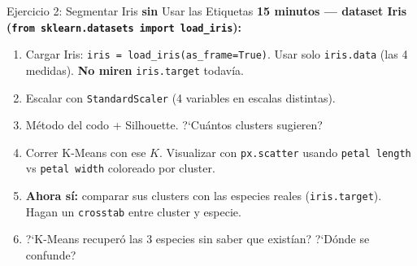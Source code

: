 \documentclass[aspectratio=169, 11pt]{beamer}
\begin{document}
\begin{frame}[shrink=5]{Ejercicio 2: Segmentar Iris \textbf{sin} Usar las Etiquetas}
  \vspace{-4pt}
  {\footnotesize\color{arcaDark}\bfseries
    \faClock\hspace{4pt} 15 minutos --- dataset Iris (\texttt{from sklearn.datasets import load\_iris}):}

  \vspace{6pt}
  {\footnotesize
  \begin{enumerate}\setlength{\itemsep}{4pt}
    \item Cargar Iris: \texttt{iris = load\_iris(as\_frame=True)}.
      Usar solo \texttt{iris.data} (las 4 medidas).
      \textbf{No miren} \texttt{iris.target} todav\'ia.
    \item Escalar con \texttt{StandardScaler} (4 variables en escalas distintas).
    \item M\'etodo del codo + Silhouette. ?`Cu\'antos clusters sugieren?
    \item Correr K-Means con ese $K$. Visualizar con \texttt{px.scatter}
      usando \texttt{petal length} vs \texttt{petal width} coloreado por cluster.
    \item \textbf{Ahora s\'i:} comparar sus clusters con las especies reales
      (\texttt{iris.target}). Hagan un \texttt{crosstab} entre cluster y especie.
    \item ?`K-Means recuper\'o las 3 especies sin saber que exist\'ian?
      ?`D\'onde se confunde?
  \end{enumerate}
  }
\end{frame}
\end{document}
